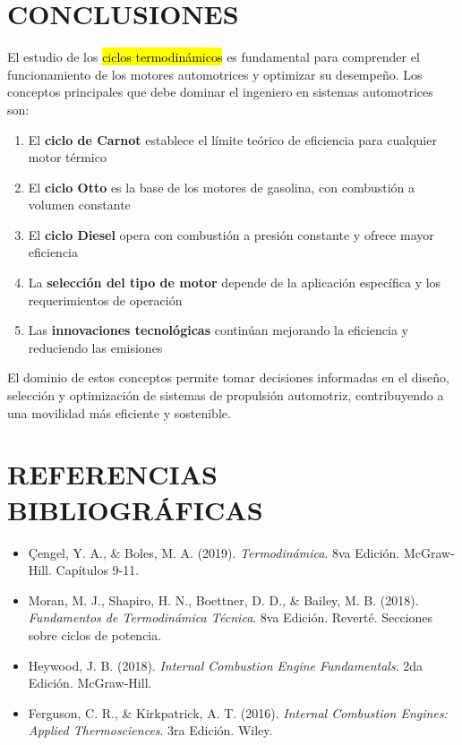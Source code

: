 \documentclass{article}
\begin{document}
\section*{CONCLUSIONES}

El estudio de los \hl{ciclos termodinámicos} es fundamental para comprender el funcionamiento de los motores automotrices y optimizar su desempeño. Los conceptos principales que debe dominar el ingeniero en sistemas automotrices son:

\begin{enumerate}
    \item El \textbf{ciclo de Carnot} establece el límite teórico de eficiencia para cualquier motor térmico
    \item El \textbf{ciclo Otto} es la base de los motores de gasolina, con combustión a volumen constante
    \item El \textbf{ciclo Diesel} opera con combustión a presión constante y ofrece mayor eficiencia
    \item La \textbf{selección del tipo de motor} depende de la aplicación específica y los requerimientos de operación
    \item Las \textbf{innovaciones tecnológicas} continúan mejorando la eficiencia y reduciendo las emisiones
\end{enumerate}

El dominio de estos conceptos permite tomar decisiones informadas en el diseño, selección y optimización de sistemas de propulsión automotriz, contribuyendo a una movilidad más eficiente y sostenible.

\vspace{5mm}

\section*{REFERENCIAS BIBLIOGRÁFICAS}

\begin{itemize}
    \item Çengel, Y. A., \& Boles, M. A. (2019). \textit{Termodinámica}. 8va Edición. McGraw-Hill. Capítulos 9-11.
    \item Moran, M. J., Shapiro, H. N., Boettner, D. D., \& Bailey, M. B. (2018). \textit{Fundamentos de Termodinámica Técnica}. 8va Edición. Reverté. Secciones sobre ciclos de potencia.
    \item Heywood, J. B. (2018). \textit{Internal Combustion Engine Fundamentals}. 2da Edición. McGraw-Hill.
    \item Ferguson, C. R., \& Kirkpatrick, A. T. (2016). \textit{Internal Combustion Engines: Applied Thermosciences}. 3ra Edición. Wiley.
\end{itemize}
\end{document}
